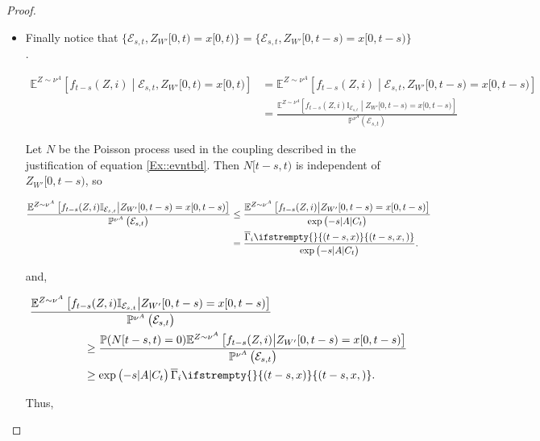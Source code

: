 \documentclass[12pt]{article}
\newcommand{\mb}{\mathbb}
\newcommand{\mc}{\mathcal}
\newcommand{\ov}{\overline}
\newcommand{\pr}{\mb{P}}							%
\newcommand{\exmu}[2]{\mb{E}^{#1}\left[#2\right]}	%
\newcommand{\poiss}{N}								%
\newcommand{\xf}{x}									%
\newcommand{\vind}[1]{_{#1}}						%
\newcommand{\tmi}[1]{#1}							%
\newcommand{\vpara}[1]{^{#1}}						%
\newcommand{\stpara}[1]{_{#1}}						%
\newcommand{\tpara}[1]{_{#1}}						%
\newcommand{\jumpbd}[1]{C_{#1}}						%
\newcommand{\tmepro}[3]{
\ifstrempty{#3}{
	(#1,#2)}{
	(#1,#2,#3)}}									%
\newcommand{\evnt}{\mc{E}}						%
\newcommand{\ratee}{\Gamma}							%
\newcommand{\grate}{\ov{\ratee}}					%
\newcommand{\mm}{\nu}								%
\newcommand{\mpara}[1]{^{#1}}						%
\newcommand{\tspara}[2]{_{#1,#2}}					%
\newcommand{\Xh}{Z}									%
\begin{document}
\begin{proof}
\begin{itemize}
\item Finally notice that \(\{\evnt\tspara{s}{t},\Xh\vind{W'}\tmi{[0,t)} = \xf\tmi{[0,t)}\} = \{\evnt\tspara{s}{t},\Xh\vind{W'}\tmi{[0,t-s)} = \xf\tmi{[0,t-s)}\}\).

\begin{align*}
\exmu{\Xh \sim\mm\vpara{A}}{f\tpara{t-s}(\Xh,i)\middle|\evnt\tspara{s}{t},\Xh\vind{W'}\tmi{[0,t)} = \xf\tmi{[0,t)}} &= \exmu{\Xh \sim\mm\vpara{A}}{f\tpara{t-s}(\Xh,i)\middle|\evnt\tspara{s}{t},\Xh\vind{W'}\tmi{[0,t-s)} = \xf\tmi{[0,t-s)}}\\
&=\frac{\exmu{\Xh \sim\mm\vpara{A}}{f\tpara{t-s}(\Xh,i)\mb{I}_{\evnt\tspara{s}{t}}\middle|\Xh\vind{W'}\tmi{[0,t-s)} = \xf\tmi{[0,t-s)}}}{\pr\mpara{\mm\vpara{A}}\left(\evnt\tspara{s}{t}\right)}
\end{align*}

Let \(\poiss\) be the Poisson process used in the coupling described in the justification of equation \eqref{Ex::evntbd}. Then \(\poiss\tmi{[t-s,t)}\) is independent of \(\Xh\vind{W'}\tmi{[0,t-s)}\), so

\begin{align*}
\frac{\exmu{\Xh \sim\mm\vpara{A}}{f\tpara{t-s}(\Xh,i)\mb{I}_{\evnt\tspara{s}{t}}\middle|\Xh\vind{W'}\tmi{[0,t-s)} = \xf\tmi{[0,t-s)}}}{\pr\mpara{\mm\vpara{A}}\left(\evnt\tspara{s}{t}\right)} &\leq \frac{\exmu{\Xh\sim\mm\vpara{A}}{f\tpara{t-s}(\Xh,i)\middle|\Xh\vind{W'}\tmi{[0,t-s)} = \xf\tmi{[0,t-s)}}}{\exp\left(-s|A|\jumpbd{t}\right)}\\
&= \frac{\grate\stpara{i}\tmepro{t-s}{\xf}{}}{\exp\left(-s|A|\jumpbd{t}\right)}.
\end{align*}

and,

\begin{align*}
&\frac{\exmu{\Xh \sim\mm\vpara{A}}{f\tpara{t-s}(\Xh,i)\mb{I}_{\evnt\tspara{s}{t}}\middle|\Xh\vind{W'}\tmi{[0,t-s)} = \xf\tmi{[0,t-s)}}}{\pr\mpara{\mm\vpara{A}}\left(\evnt\tspara{s}{t}\right)} \\
&\hspace{48 pt}\geq \frac{\pr(\poiss\tmi{[t-s,t)} = 0)\exmu{\Xh \sim\mm\vpara{A}}{f\tpara{t-s}(\Xh,i)\middle|\Xh\vind{W'}\tmi{[0,t-s)} = \xf\tmi{[0,t-s)}}}{\pr\mpara{\mm\vpara{A}}\left(\evnt\tspara{s}{t}\right)}\\
&\hspace{48 pt} \geq \exp\left(-s|A|\jumpbd{t}\right)\grate\stpara{i}\tmepro{t-s}{\xf}{}.
\end{align*}

Thus,


\end{itemize}
\end{proof}
\end{document}
